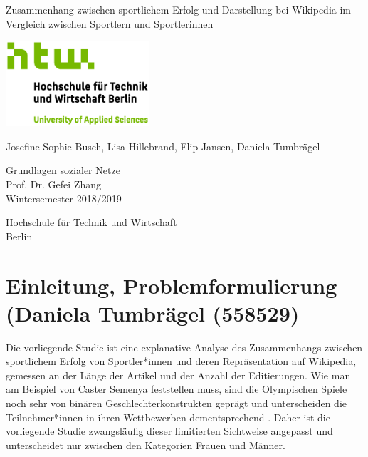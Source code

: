 \documentclass[11pt]{article}
\begin{document}
\begin{titlepage}
   \begin{center}
       \vspace*{1cm}
       
       \Huge	
       Zusammenhang zwischen sportlichem Erfolg und Darstellung bei Wikipedia im Vergleich zwischen Sportlern und Sportlerinnen 
       \vspace{2.0cm}       
       
       \includegraphics[width=0.4\textwidth]{logo.jpg} 
       
       \vspace{1.5cm}
       \LARGE
       
       Josefine Sophie Busch, Lisa Hillebrand, Flip Jansen, Daniela Tumbrägel
 
       \vfill
 
       Grundlagen sozialer Netze \\
       Prof. Dr. Gefei Zhang\\
       Wintersemester 2018/2019\\
 
       \vspace{0.8cm}
      
       Hochschule für Technik und Wirtschaft\\
       Berlin\\
 
   \end{center}
\end{titlepage}

\pagebreak
\tableofcontents
\pagebreak
\listoftables
\listoffigures
\pagebreak

\section{Einleitung, Problemformulierung (Daniela Tumbrägel (558529)}

Die vorliegende Studie ist eine explanative Analyse des Zusammenhangs zwischen sportlichem Erfolg von Sportler*innen und deren Repräsentation auf Wikipedia, gemessen an der Länge der Artikel und der Anzahl der Editierungen. Wie man am Beispiel von Caster Semenya feststellen muss, sind die Olympischen Spiele noch sehr von binären Geschlechterkonstrukten geprägt und unterscheiden die Teilnehmer*innen in ihren Wettbewerben dementsprechend \parencite{IOCRules}. Daher ist die vorliegende Studie zwangsläufig dieser limitierten Sichtweise angepasst und unterscheidet nur zwischen den Kategorien Frauen und Männer.
\end{document}
